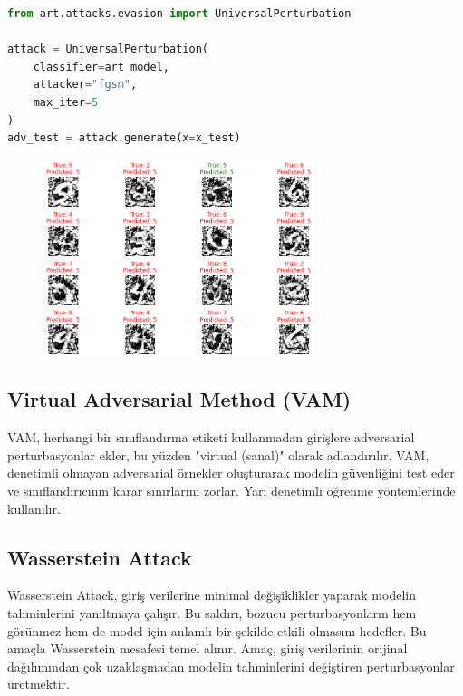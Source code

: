 \begin{lstlisting}[language=Python]
from art.attacks.evasion import UniversalPerturbation

attack = UniversalPerturbation(
    classifier=art_model, 
    attacker="fgsm", 
    max_iter=5
)
adv_test = attack.generate(x=x_test)
\end{lstlisting}

\begin{figure}[h]
    \centering
    \includegraphics[width=0.7\textwidth]{images/universal_perturbation_example.png}
    \caption{}
\end{figure}

\newpage

\subsection{Virtual Adversarial Method (VAM)}

VAM, herhangi bir sınıflandırma etiketi kullanmadan girişlere adversarial perturbasyonlar ekler, bu yüzden "virtual (sanal)" olarak adlandırılır. VAM, denetimli olmayan adversarial örnekler oluşturarak modelin güvenliğini test eder ve sınıflandırıcının karar sınırlarını zorlar. Yarı denetimli öğrenme yöntemlerinde kullanılır.

\newpage

\subsection{Wasserstein Attack}

Wasserstein Attack, giriş verilerine minimal değişiklikler yaparak modelin tahminlerini yanıltmaya çalışır. Bu saldırı, bozucu perturbasyonların hem görünmez hem de model için anlamlı bir şekilde etkili olmasını hedefler. Bu amaçla Wasserstein mesafesi temel alınır. Amaç, giriş verilerinin orijinal dağılımından çok uzaklaşmadan modelin tahminlerini değiştiren perturbasyonlar üretmektir.

